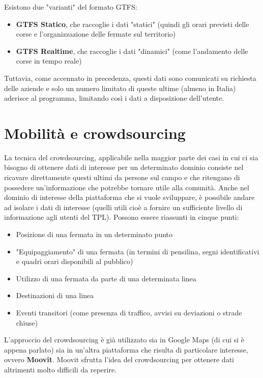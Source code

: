     Esistono due "varianti" del formato GTFS:
    \begin{itemize}
        \item \textbf{GTFS Statico}, che raccoglie i dati "statici" (quindi gli orari previsti delle corse e l'organizzazione delle fermate sul territorio)
        \item \textbf{GTFS Realtime}, che raccoglie i dati "dinamici" (come l'andamento delle corse in tempo reale)
    \end{itemize}

    Tuttavia, come accennato in precedenza, questi dati sono comunicati su richiesta delle aziende e solo un numero limitato di queste ultime (almeno in Italia) aderisce al programma, limitando così i dati a disposizione dell'utente.

\section{Mobilità e crowdsourcing}
    La tecnica del crowdsourcing, applicabile nella maggior parte dei casi in cui ci sia bisogno di ottenere dati di interesse per un determinato dominio consiste nel ricavare direttamente questi ultimi da persone sul campo e che ritengano di possedere un'informazione che potrebbe tornare utile alla comunità.
    Anche nel dominio di interesse della piattaforma che si vuole sviluppare, è possibile andare ad isolare i dati di interesse (quelli utili cioè a fornire un sufficiente livello di informazione agli utenti del TPL). Possono essere riassunti in cinque punti:
            \begin{itemize}
                \item Posizione di una fermata in un determinato punto
                \item "Equipaggiamento" di una fermata (in termini di pensilina, segni identificativi e quadri orari disponibili al pubblico)
                \item Utilizzo di una fermata da parte di una determinata linea
                \item Destinazioni di una linea
                \item Eventi transitori (come presenza di traffico, avvisi su deviazioni o strade chiuse)
            \end{itemize}

        L'approccio del crowdsourcing è già utilizzato sia in Google Maps (di cui si è appena parlato) sia in un'altra piattaforma che risulta di particolare interesse, ovvero \textbf{Moovit}. Moovit sfrutta l'idea del crowdsourcing per ottenere dati altrimenti molto difficili da reperire.

